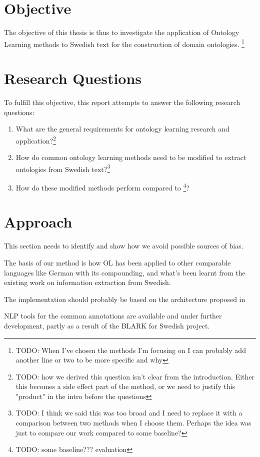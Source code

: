\documentclass[a4paper]{report}
\newcommand{\todo}[1]{\footnote{{\color{red} TODO: #1}}}
\begin{document}
\section{Objective}

The objective of this thesis is thus to investigate the application of Ontology Learning methods to Swedish text for the construction of domain ontologies. \todo{When I've chosen the methods I'm focusing on I can probably add another line or two to be more specific and why}

\section{Research Questions}

To fulfill this objective, this report attempts to answer the following research questions:

\begin{enumerate}
  \item{What are the general requirements for ontology learning research and application?\todo{how we derived this question isn't clear from the introduction. Either this becomes a side effect part of the method, or we need to justify this "product" in the intro before the questions}}
  \item{How do common ontology learning methods need to be modified to extract ontologies from Swedish text?\todo{I think we said this was too broad and I need to replace it with a comparison between two methods when I choose them. Perhaps the idea was just to compare our work compared to some baseline?}}
  \item{How do these modified methods perform compared to \todo{some baseline??? evaluation}?}
\end{enumerate}

\section{Approach}

This section needs to identify and show how we avoid possible sources of bias.

The basis of our method is how OL has been applied to other comparable languages like German with its compounding, and what's been learnt from the existing work on information extraction from Swedish.

The implementation should probably be based on the architecture proposed in \cite{Cimiano2009OL}

NLP tools for the common annotations are available and under further development, partly as a result of the BLARK for Swedish project.
\end{document}
